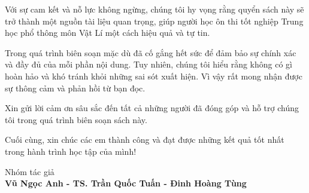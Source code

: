 Với sự cam kết và nỗ lực không ngừng, chúng tôi hy vọng rằng quyển sách này sẽ trở thành một nguồn tài liệu quan trọng, giúp người học ôn thi tốt nghiệp Trung học phổ thông môn Vật Lí một cách hiệu quả và tự tin. 

Trong quá trình biên soạn mặc dù đã cố gắng hết sức để đảm bảo sự chính xác và đầy đủ của mỗi phần nội dung. Tuy nhiên, chúng tôi hiểu rằng không có gì hoàn hảo và khó tránh khỏi những sai sót xuất hiện. Vì vậy rất mong nhận được sự thông cảm và phản hồi từ bạn đọc. 

Xin gửi lời cảm ơn sâu sắc đến tất cả những người đã đóng góp và hỗ trợ chúng tôi trong quá trình biên soạn sách này. 

Cuối cùng, xin chúc các em thành công và đạt được những kết quả tốt nhất trong hành trình học tập của mình!
\begin{flushright}
\parbox{0.8\textwidth}{
\begin{center}
Nhóm tác giả\\
\textcolor{coolblack}{\textbf{Vũ Ngọc Anh - TS. Trần Quốc Tuấn - Đinh Hoàng Tùng}}
\end{center}
}
\end{flushright}